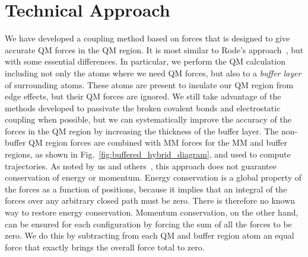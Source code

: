 \documentclass[11pt]{revtex4}
\begin{document}
% 
% 
% 


\section{Technical Approach}

We have developed a coupling method based on forces that is designed
to give accurate QM forces in the QM region.  It is most similar
to Rode's approach~\cite{kerdcharoen_chem_phys_1996a}, but with
some essential differences.  In particular, we perform the QM
calculation including not only the atoms where we need QM forces,
but also to a {\em buffer layer} of surrounding atoms.  These atoms
are present to insulate our QM region from edge effects, but their
QM forces are ignored.  We still take advantage of the methods
developed to passivate the broken covalent bonds and electrostatic
coupling when possible, but we can systematically improve the
accuracy of the forces in the QM region by increasing the thickness
of the buffer layer.  The non-buffer QM region forces are combined
with MM forces for the MM and buffer regions, as shown in
Fig.~\ref{fig:buffered_hybrid_diagram}, and used to compute
trajectories.  As noted by us and
others~\cite{heyden_j_phys_chem_b_2007a,bernstein_rep_prog_phys_2009a},
this approach does not guarantee conservation of energy or momentum.
Energy conservation is a global property of the forces as a function
of positions, because it implies that an integral of the forces
over any arbitrary closed path must be zero.  There is therefore
no known way to restore energy conservation.  Momentum conservation,
on the other hand, can be ensured for each configuration by forcing
the sum of all the forces to be zero.  We do this by subtracting
from each QM and buffer region atom an equal force that exactly
brings the overall force total to zero.
\end{document}
